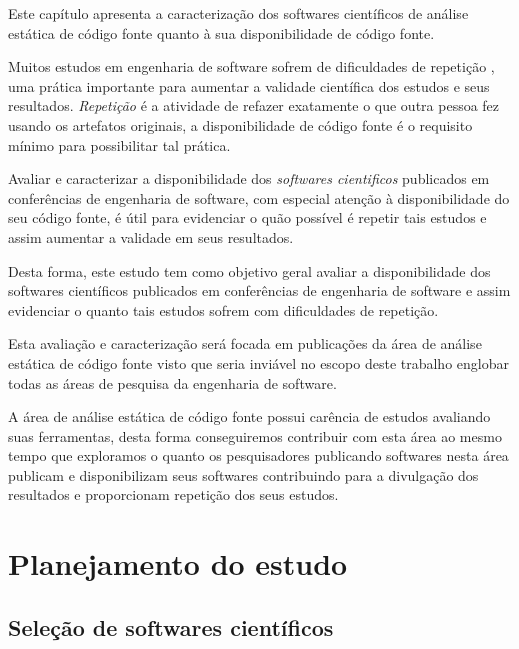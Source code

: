 {Este capítulo apresenta a caracterização dos softwares científicos de análise
estática de código fonte quanto à sua disponibilidade de código fonte.}
\label{caracterizacao-ferramentas}


Muitos estudos em engenharia de software sofrem de dificuldades de repetição
\cite{Tang2016}, uma prática importante para aumentar a validade científica dos
estudos e seus resultados. {\it Repetição} é a atividade de refazer exatamente
o que outra pessoa fez usando os artefatos originais, a disponibilidade de
código fonte é o requisito mínimo para possibilitar tal prática.

Avaliar e caracterizar a disponibilidade dos {\it softwares cientificos}
publicados em conferências de engenharia de software, com especial atenção à
disponibilidade do seu código fonte, é útil para evidenciar o quão possível é
repetir tais estudos e assim aumentar a validade em seus resultados.

Desta forma, este estudo tem como objetivo geral avaliar a disponibilidade dos
softwares científicos publicados em conferências de engenharia de software e
assim evidenciar o quanto tais estudos sofrem com dificuldades de repetição.

Esta avaliação e caracterização será focada em publicações da área de análise
estática de código fonte visto que seria inviável no escopo deste trabalho
englobar todas as áreas de pesquisa da engenharia de software.

A área de análise estática de código fonte possui carência de estudos avaliando
suas ferramentas, desta forma conseguiremos contribuir com esta área ao mesmo
tempo que exploramos o quanto os pesquisadores publicando softwares nesta área
publicam e disponibilizam seus softwares contribuindo para a divulgação dos
resultados e proporcionam repetição dos seus estudos.

\section{Planejamento do estudo}

\subsection{Seleção de softwares científicos}

